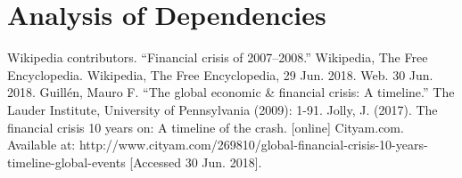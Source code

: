 \documentclass[11pt]{article}
\begin{document}
\section{Analysis of Dependencies}\vspace{-1em}



\vspace{-0.8em}
\begin{thebibliography}{9}
 Wikipedia contributors. ``Financial crisis of 2007–2008.'' Wikipedia, The Free Encyclopedia. Wikipedia, The Free Encyclopedia, 29 Jun. 2018. Web. 30 Jun. 2018.
 Guillén, Mauro F. ``The global economic \& financial crisis: A timeline.'' The Lauder Institute, University of Pennsylvania (2009): 1-91.
 Jolly, J. (2017). The financial crisis 10 years on: A timeline of the crash. [online] Cityam.com. Available at: http://www.cityam.com/269810/global-financial-crisis-10-years-timeline-global-events [Accessed 30 Jun. 2018].
\end{thebibliography}
\end{document}
